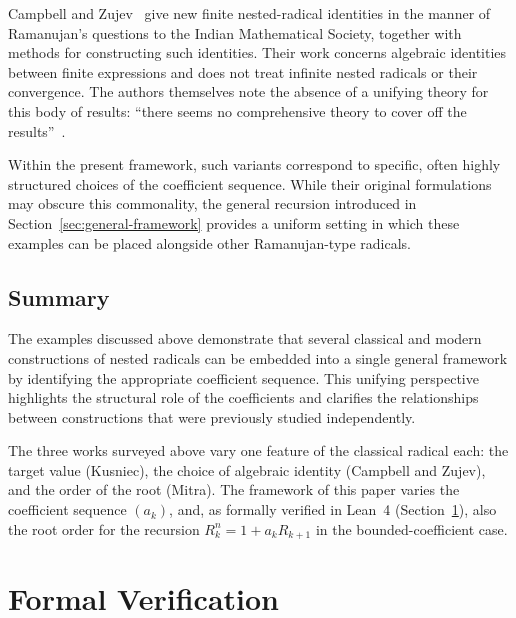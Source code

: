 \documentclass[11pt,a4paper]{amsart}
\theoremstyle{plain}
\theoremstyle{definition}
\theoremstyle{remark}
\begin{document}
Campbell and Zujev~\cite{CampbellZujevRadicals} give new finite nested-radical identities in the manner of Ramanujan's questions to the Indian Mathematical Society, together with methods for constructing such identities. Their work concerns algebraic identities between finite expressions and does not treat infinite nested radicals or their convergence. The authors themselves note the absence of a unifying theory for this body of results: \enquote{there seems no comprehensive theory to cover off the results}~\cite{CampbellZujevRadicals}.

Within the present framework, such variants correspond to specific, often highly structured choices of the coefficient sequence. While their original formulations may obscure this commonality, the general recursion introduced in Section~\ref{sec:general-framework} provides a uniform setting in which these examples can be placed alongside other Ramanujan-type radicals.

\subsection{Summary}

The examples discussed above demonstrate that several classical and modern constructions of nested radicals can be embedded into a single general framework by identifying the appropriate coefficient sequence. This unifying perspective highlights the structural role of the coefficients and clarifies the relationships between constructions that were previously studied independently.

The three works surveyed above vary one feature of the classical radical each: the target value (Kusniec), the choice of algebraic identity (Campbell and Zujev), and the order of the root (Mitra). The framework of this paper varies the coefficient sequence $(a_k)$, and, as formally verified in Lean~4 (Section~\ref{sec:formal-verification}), also the root order for the recursion $R_k^n=1+a_kR_{k+1}$ in the bounded-coefficient case.



\section{Formal Verification}
\label{sec:formal-verification}
\end{document}
